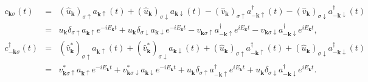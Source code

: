\documentclass[uplatex,a4j,12pt,dvipdfmx]{jsarticle}
\begin{document}
\begin{eqnarray}
	c_{\bm{k} \sigma}(t)
	&=&
	(\hat{u}_{\bm{k}})_{\sigma \uparrow} a_{\bm{k} \uparrow}(t)
	+
	(\hat{u}_{\bm{k}})_{\sigma \downarrow} a_{\bm{k} \downarrow}(t)
	-
	(\hat{v}_{\bm{k}})_{\sigma \uparrow} a_{-\bm{k} \uparrow}^{\dagger}(t)
	-
	(\hat{v}_{\bm{k}})_{\sigma \downarrow} a_{-\bm{k} \downarrow}^{\dagger}(t)
	\nonumber \\[2mm] &=&
	u_{\bm{k}} \delta_{\sigma \uparrow} a_{\bm{k} \uparrow} e^{- i E_{\bm{k}} t}
	+
	u_{\bm{k}} \delta_{\sigma \downarrow} a_{\bm{k} \downarrow} e^{- i E_{\bm{k}} t}
	-
	v_{\bm{k} \sigma \uparrow} a_{-\bm{k} \uparrow}^{\dagger} e^{ i E_{\bm{k}} t}
	-
	v_{\bm{k} \sigma \downarrow} a_{-\bm{k} \downarrow}^{\dagger} e^{ i E_{\bm{k}} t}
	,
	\\[4mm]
	c_{-\bm{k} \sigma}^{\dagger}(t)
	&=&
	(\hat{v}_{\bm{k}}^{*})_{\sigma \uparrow} a_{\bm{k} \uparrow}(t)
	+
	(\hat{v}_{\bm{k}}^{*})_{\sigma \downarrow} a_{\bm{k} \downarrow}(t)
	+
	(\hat{u}_{\bm{k}})_{\sigma \uparrow} a_{-\bm{k} \uparrow}^{\dagger}(t)
	+
	(\hat{u}_{\bm{k}})_{\sigma \downarrow} a_{-\bm{k} \downarrow}^{\dagger}(t)
	\nonumber \\[2mm] &=&
	v_{\bm{k} \sigma \uparrow}^{*} a_{\bm{k} \uparrow} e^{- i E_{\bm{k}} t}
	+
	v_{\bm{k} \sigma \downarrow}^{*} a_{\bm{k} \downarrow} e^{- i E_{\bm{k}} t}
	+
	u_{\bm{k}} \delta_{\sigma \uparrow} a_{-\bm{k} \uparrow}^{\dagger} e^{ i E_{\bm{k}} t}
	+
	u_{\bm{k}} \delta_{\sigma \downarrow} a_{-\bm{k} \downarrow}^{\dagger} e^{ i E_{\bm{k}} t}
	.
\end{eqnarray}
\end{document}
